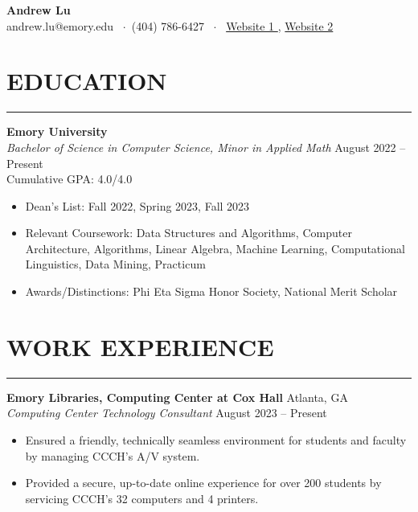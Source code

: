 \documentclass[10.5pt]{article}
\begin{document}
\noindent
\begin{center}
{\Large \textbf{\fontsize{14pt}{14pt}\selectfont Andrew Lu}} \\
andrew.lu@emory.edu \faEnvelope~$\cdot$~(404) 786-6427 \faPhone~$\cdot$~
\href{https://andrewtlu.github.io}{Website 1 \faInfo }, \href{https://www.boredbutton.com}{Website 2 \faInfo }
\end{center}

\section*{\large\textbf{EDUCATION}}
\vspace{-\baselineskip}
\noindent\rule{\textwidth}{0.4pt}

\noindent
\textbf{Emory University} \\
\emph{Bachelor of Science in Computer Science, Minor in Applied Math} \hfill August 2022 -- Present \\ 
Cumulative GPA: 4.0/4.0 
\begin{itemize}
\item Dean's List: Fall 2022, Spring 2023, Fall 2023
\item Relevant Coursework: Data Structures and Algorithms, Computer Architecture, Algorithms, Linear Algebra, Machine Learning, Computational Linguistics, Data Mining, Practicum
\item Awards/Distinctions: Phi Eta Sigma Honor Society, National Merit Scholar
\end{itemize}
 \vspace{-\baselineskip}
\section*{\large\textbf{WORK EXPERIENCE}} 
 \vspace{-\baselineskip} 
\noindent\rule{\textwidth}{0.4pt} 


\noindent
\textbf{Emory Libraries, Computing Center at Cox Hall} \hfill {Atlanta, GA}\\
\emph{Computing Center Technology Consultant} \hfill {August 2023} -- {Present}
\begin{itemize}
    \item Ensured a friendly, technically seamless environment for students and faculty by managing CCCH's A/V system. \item Provided a secure, up-to-date online experience for over 200 students by servicing CCCH's 32 computers and 4 printers.
\end{itemize}
\end{document}
